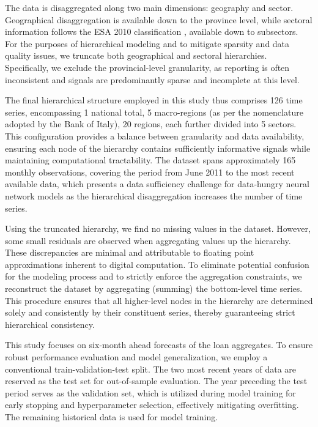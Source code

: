 \documentclass[letterpaper]{article}
\begin{document}
The data is disaggregated along two main dimensions: geography and sector. Geographical disaggregation is available down to the province level, while sectoral information follows the ESA 2010 classification \cite{esa2010}, available down to subsectors. For the purposes of hierarchical modeling and to mitigate sparsity and data quality issues, we truncate both geographical and sectoral hierarchies. Specifically, we exclude the provincial-level granularity, as reporting is often inconsistent and signals are predominantly sparse and incomplete at this level.

The final hierarchical structure employed in this study thus comprises 126 time series, encompassing 1 national total, 5 macro-regions (as per the nomenclature adopted by the Bank of Italy), 20 regions, each further divided into 5 sectors. This configuration provides a balance between granularity and data availability, ensuring each node of the hierarchy contains sufficiently informative signals while maintaining computational tractability. The dataset spans approximately 165 monthly observations, covering the period from June 2011 to the most recent available data, which presents a data sufficiency challenge for data-hungry neural network models as the hierarchical disaggregation increases the number of time series.

Using the truncated hierarchy, we find no missing values in the dataset. However, some small residuals are observed when aggregating values up the hierarchy. These discrepancies are minimal and attributable to floating point approximations inherent to digital computation. To eliminate potential confusion for the modeling process and to strictly enforce the aggregation constraints, we reconstruct the dataset by aggregating (summing) the bottom-level time series. This procedure ensures that all higher-level nodes in the hierarchy are determined solely and consistently by their constituent series, thereby guaranteeing strict hierarchical consistency.

This study focuses on six-month ahead forecasts of the loan aggregates. To ensure robust performance evaluation and model generalization, we employ a conventional train-validation-test split. The two most recent years of data are reserved as the test set for out-of-sample evaluation. The year preceding the test period serves as the validation set, which is utilized during model training for early stopping and hyperparameter selection, effectively mitigating overfitting. The remaining historical data is used for model training.
\end{document}
